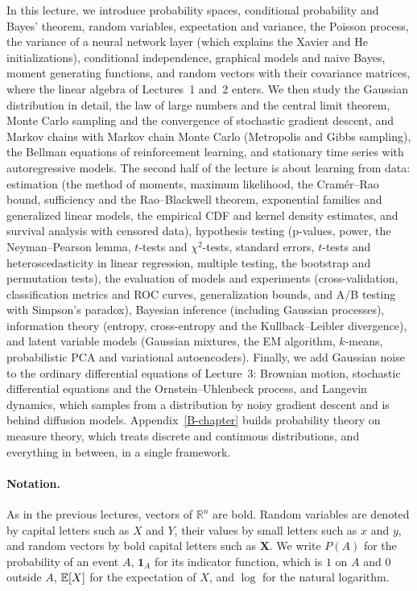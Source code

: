 In this lecture, we introduce probability spaces, conditional probability and Bayes' theorem, random variables, expectation and variance, the Poisson process, the variance of a neural network layer (which explains the Xavier and He initializations), conditional independence, graphical models and naive Bayes, moment generating functions, and random vectors with their covariance matrices, where the linear algebra of Lectures~1 and~2 enters. We then study the Gaussian distribution in detail, the law of large numbers and the central limit theorem, Monte Carlo sampling and the convergence of stochastic gradient descent, and Markov chains with Markov chain Monte Carlo (Metropolis and Gibbs sampling), the Bellman equations of reinforcement learning, and stationary time series with autoregressive models. The second half of the lecture is about learning from data: estimation (the method of moments, maximum likelihood, the Cram\'er--Rao bound, sufficiency and the Rao--Blackwell theorem, exponential families and generalized linear models, the empirical CDF and kernel density estimates, and survival analysis with censored data), hypothesis testing (p-values, power, the Neyman--Pearson lemma, $t$-tests and $\chi^2$-tests, standard errors, $t$-tests and heteroscedasticity in linear regression, multiple testing, the bootstrap and permutation tests), the evaluation of models and experiments (cross-validation, classification metrics and ROC curves, generalization bounds, and A/B testing with Simpson's paradox), Bayesian inference (including Gaussian processes), information theory (entropy, cross-entropy and the Kullback--Leibler divergence), and latent variable models (Gaussian mixtures, the EM algorithm, $k$-means, probabilistic PCA and variational autoencoders). Finally, we add Gaussian noise to the ordinary differential equations of Lecture~3: Brownian motion, stochastic differential equations and the Ornstein--Uhlenbeck process, and Langevin dynamics, which samples from a distribution by noisy gradient descent and is behind diffusion models. Appendix~\ref{B-chapter} builds probability theory on measure theory, which treats discrete and continuous distributions, and everything in between, in a single framework.

\paragraph{Notation.} As in the previous lectures, vectors of $\mathbb{R}^n$ are bold. Random variables are denoted by capital letters such as $X$ and $Y$, their values by small letters such as $x$ and $y$, and random vectors by bold capital letters such as $\mathbf{X}$. We write $P(A)$ for the probability of an event $A$, $\mathbf{1}_A$ for its indicator function, which is $1$ on $A$ and $0$ outside $A$, $\mathbb{E}[X]$ for the expectation of $X$, and $\log$ for the natural logarithm.

